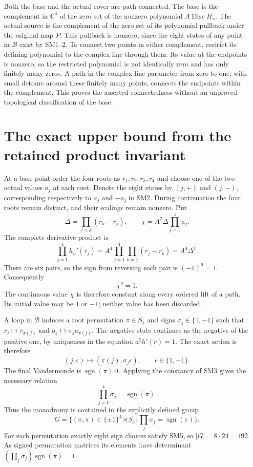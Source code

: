 \documentclass[11pt]{article}
\newcommand{\C}{\mathbb C}
\newcommand{\Disc}{\operatorname{Disc}}
\newcommand{\sgn}{\operatorname{sgn}}
\begin{document}
Both the base and the actual cover are path connected. The base
is the complement in $\C^4$ of the zero set of the nonzero
polynomial $A\Disc H_u$. The actual source is the complement
of the zero set of its polynomial pullback under the original map
$P$. This pullback is nonzero, since the eight states of any point
in $\mathcal B$ exist by SM1--2. To connect two points in either
complement, restrict its defining polynomial to the complex line
through them. Its value at the endpoints is nonzero, so the
restricted polynomial is not identically zero and has only
finitely many zeros. A path in the complex line parameter from
zero to one, with small detours around these finitely many points,
connects the endpoints within the complement. This proves the
asserted connectedness without an unproved topological
classification of the base.

\section{The exact upper bound from the retained product invariant}
At a base point order the four roots as $r_1,r_2,r_3,r_4$ and
choose one of the two actual values $a_j$ at each root. Denote
the eight states by $(j,+)$ and $(j,-)$, corresponding respectively
to $a_j$ and $-a_j$ in SM2. During continuation the four roots
remain distinct, and their scalings remain nonzero. Put
\[
 \Delta=\prod_{j<k}(r_k-r_j),\qquad
 \chi=A^2\Delta\prod_{j=1}^4a_j.
\]
The complete derivative product is
\[
 \prod_{j=1}^4h_u'(r_j)
 =A^4\prod_{j=1}^4\prod_{k\ne j}(r_j-r_k)
 =A^4\Delta^2.
\]
There are six pairs, so the sign from reversing each pair is
$(-1)^6=1$. Consequently
\begin{equation}
 \chi^2=1.\tag{SM3}
\end{equation}
The continuous value $\chi$ is therefore constant along every
ordered lift of a path. Its initial value may be $1$ or $-1$;
neither value has been discarded.

A loop in $\mathcal B$ induces a root permutation $\pi\in S_4$
and signs $\sigma_j\in\{1,-1\}$ such that
$r_j\mapsto r_{\pi(j)}$ and $a_j\mapsto\sigma_j a_{\pi(j)}$.
The negative state continues as the negative of the positive one,
by uniqueness in the equation $a^2h'(r)=1$. The exact action is
therefore
\begin{equation}
 (j,\epsilon)\longmapsto(\pi(j),\sigma_j\epsilon),
 \qquad \epsilon\in\{1,-1\}.\tag{SM4}
\end{equation}
The final Vandermonde is $\sgn(\pi)\Delta$. Applying the
constancy of SM3 gives the necessary relation
\begin{equation}
 \prod_{j=1}^4\sigma_j=\sgn(\pi).\tag{SM5}
\end{equation}
Thus the monodromy is contained in the explicitly defined group
\begin{equation}
 G=\{(\sigma,\pi)\in\{\pm1\}^4\rtimes S_4:
                       \prod_j\sigma_j=\sgn(\pi)\}.
 \tag{SM6}
\end{equation}
For each permutation exactly eight sign choices satisfy SM5, so
$|G|=8\cdot24=192$. As signed permutation matrices its elements
have determinant $(\prod_j\sigma_j)\sgn(\pi)=1$.
\end{document}
